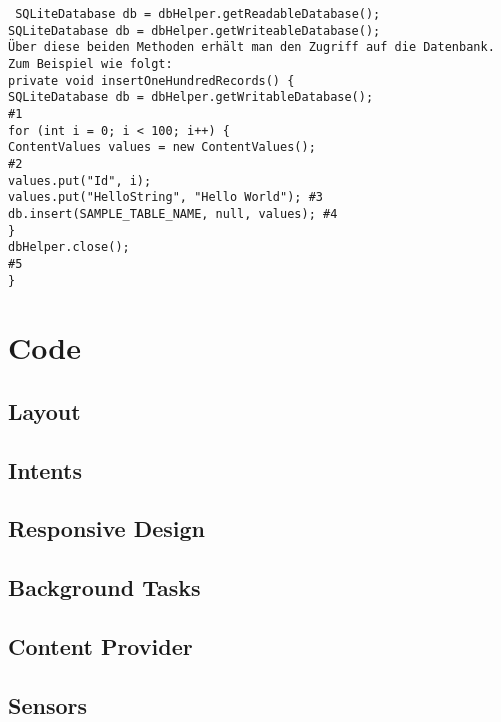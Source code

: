 \documentclass[a4paper,10pt,titlepage=false]{scrreprt}
\begin{document}
\begin{verbatim}
 SQLiteDatabase db = dbHelper.getReadableDatabase();
SQLiteDatabase db = dbHelper.getWriteableDatabase();
Über diese beiden Methoden erhält man den Zugriff auf die Datenbank. Zum Beispiel wie folgt:
private void insertOneHundredRecords() {
SQLiteDatabase db = dbHelper.getWritableDatabase();
#1
for (int i = 0; i < 100; i++) {
ContentValues values = new ContentValues();
#2
values.put("Id", i);
values.put("HelloString", "Hello World"); #3
db.insert(SAMPLE_TABLE_NAME, null, values); #4
}
dbHelper.close();
#5
}
\end{verbatim}



\part{Code}
\chapter{Layout}


\chapter{Intents}




\chapter{Responsive Design}








\chapter{Background Tasks}



\chapter{Content Provider}



\chapter{Sensors}

\end{document}
